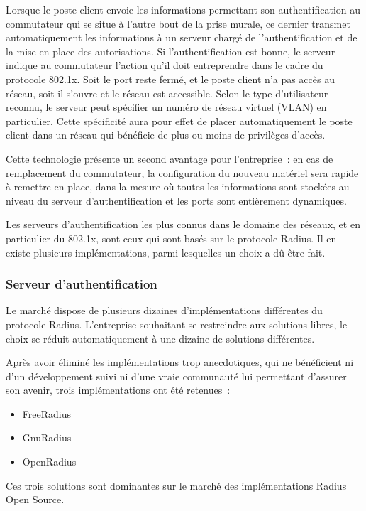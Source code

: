 Lorsque le poste client envoie les informations permettant son authentification au commutateur qui se situe à l'autre bout de la prise murale, ce dernier transmet automatiquement les informations à un serveur chargé de l'authentification et de la mise en place des autorisations. Si l'authentification est bonne, le serveur indique au commutateur l'action qu'il doit entreprendre dans le cadre du protocole 802.1x. Soit le port reste fermé, et le poste client n'a pas accès au réseau, soit il s'ouvre et le réseau est accessible. Selon le type d'utilisateur reconnu, le serveur peut spécifier un numéro de réseau virtuel (VLAN) en particulier. Cette spécificité aura pour effet de placer automatiquement le poste client dans un réseau qui bénéficie de plus ou moins de privilèges d'accès.

Cette technologie présente un second avantage pour l'entreprise~: en cas de remplacement du commutateur, la configuration du nouveau matériel sera rapide à remettre en place, dans la mesure où toutes les informations sont stockées au niveau du serveur d'authentification et les ports sont entièrement dynamiques.

Les serveurs d'authentification les plus connus dans le domaine des réseaux, et en particulier du 802.1x, sont ceux qui sont basés sur le protocole Radius. Il en existe plusieurs implémentations, parmi lesquelles un choix a dû être fait.

\subsubsection{Serveur d'authentification}

Le marché dispose de plusieurs dizaines d'implémentations différentes du protocole Radius. L'entreprise souhaitant se restreindre aux solutions libres, le choix se réduit automatiquement à une dizaine de solutions différentes.

Après avoir éliminé les implémentations trop anecdotiques, qui ne bénéficient ni d'un développement suivi ni d'une vraie communauté lui permettant d'assurer son avenir, trois implémentations ont été retenues~:

\begin{itemize}
\item FreeRadius
\item GnuRadius
\item OpenRadius
\end{itemize}

Ces trois solutions sont dominantes sur le marché des implémentations Radius Open Source.

